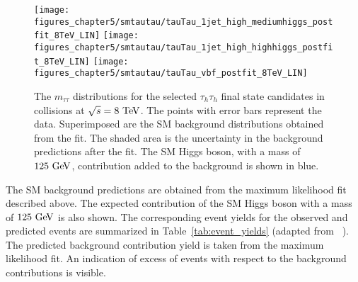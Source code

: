 \begin{figure}[htbp]
\centering
\texttt{[image: figures\_chapter5/smtautau/tauTau\_1jet\_high\_mediumhiggs\_postfit\_8TeV\_LIN]}
\texttt{[image: figures\_chapter5/smtautau/tauTau\_1jet\_high\_highhiggs\_postfit\_8TeV\_LIN]}
\texttt{[image: figures\_chapter5/smtautau/tauTau\_vbf\_postfit\_8TeV\_LIN]}
\caption{The $m_{\tau\tau}$ distributions for the selected $\tau_{h}\tau_{h}$ final state candidates in collisions at $\sqrt{s}=8~\mathrm{Te\kern -0.1em V}$. The points with error bars represent the data. Superimposed are the SM background distributions obtained from the fit. The shaded area is the uncertainty in the background predictions after the fit. The SM Higgs boson, with a mass of $125~\mathrm{Ge\kern -0.1em V}$, contribution added to the background is shown in blue.}
\label{fig:tautau}
\end{figure}
The SM background predictions are obtained from the maximum likelihood fit described above.  The expected contribution of the SM Higgs boson with a mass of $125~\mathrm{Ge\kern -0.1em V}$ is also shown. The corresponding event yields for the observed and predicted events are summarized in Table~\ref{tab:event_yields} (adapted from ~\cite{Chatrchyan:2014nva}). The predicted background contribution yield is taken from the maximum likelihood fit. An indication of excess of events with respect to the background contributions is visible.  
